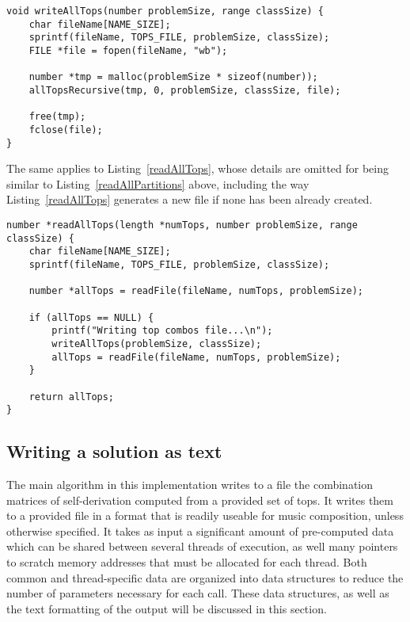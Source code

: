 \begin{lstlisting}[caption={Writing all tops to a file.},label={writeAllTops}]
void writeAllTops(number problemSize, range classSize) {
    char fileName[NAME_SIZE];
    sprintf(fileName, TOPS_FILE, problemSize, classSize);
    FILE *file = fopen(fileName, "wb");

    number *tmp = malloc(problemSize * sizeof(number));
    allTopsRecursive(tmp, 0, problemSize, classSize, file);

    free(tmp);
    fclose(file);
}
\end{lstlisting}

The same applies to Listing~\ref{readAllTops}, whose details are omitted for being similar to Listing~\ref{readAllPartitions} above, including the way Listing~\ref{readAllTops} generates a new file if none has been already created.

\begin{lstlisting}[caption={Reading all tops from a file.},label={readAllTops}]
number *readAllTops(length *numTops, number problemSize, range classSize) {
    char fileName[NAME_SIZE];
    sprintf(fileName, TOPS_FILE, problemSize, classSize);

    number *allTops = readFile(fileName, numTops, problemSize);

    if (allTops == NULL) {
        printf("Writing top combos file...\n");
        writeAllTops(problemSize, classSize);
        allTops = readFile(fileName, numTops, problemSize);
    }

    return allTops;
}
\end{lstlisting}

\subsection{Writing a solution as text}

The main algorithm in this implementation writes to a file the combination matrices of self-derivation computed from a provided set of tops. It writes them to a provided file in a format that is readily useable for music composition, unless otherwise specified. It takes as input a significant amount of pre-computed data which can be shared between several threads of execution, as well many pointers to scratch memory addresses that must be allocated for each thread. Both common and thread-specific data are organized into data structures to reduce the number of parameters necessary for each call. These data structures, as well as the text formatting of the output will be discussed in this section.

